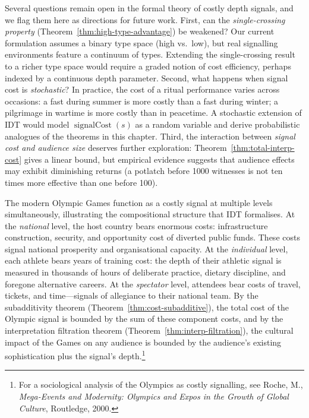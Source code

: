 \begin{remark}
Several questions remain open in the formal theory of costly depth
signals, and we flag them here as directions for future work.
First, can the \emph{single-crossing property}
(Theorem~\ref{thm:high-type-advantage}) be weakened?  Our current
formulation assumes a binary type space (high vs.\ low), but real
signalling environments feature a continuum of types.  Extending the
single-crossing result to a richer type space would require a graded
notion of cost efficiency, perhaps indexed by a continuous depth
parameter.  Second, what happens when signal cost is
\emph{stochastic}?  In practice, the cost of a ritual performance
varies across occasions: a fast during summer is more costly than a
fast during winter; a pilgrimage in wartime is more costly than in
peacetime.  A stochastic extension of IDT would model
$\operatorname{signalCost}(s)$ as a random variable and derive
probabilistic analogues of the theorems in this chapter.  Third, the
interaction between \emph{signal cost and audience size} deserves
further exploration: Theorem~\ref{thm:total-interp-cost} gives a
linear bound, but empirical evidence suggests that audience effects may
exhibit diminishing returns (a potlatch before 1000 witnesses is not
ten times more effective than one before 100).
\end{remark}

\begin{example}
The modern Olympic Games function as a costly signal at multiple
levels simultaneously, illustrating the compositional structure that
IDT formalises.  At the \emph{national} level, the host country bears
enormous costs: infrastructure construction, security, and
opportunity cost of diverted public funds.  These costs signal
national prosperity and organisational capacity.  At the
\emph{individual} level, each athlete bears years of training cost:
the depth of their athletic signal is measured in thousands of hours
of deliberate practice, dietary discipline, and foregone alternative
careers.  At the \emph{spectator} level, attendees bear costs of
travel, tickets, and time---signals of allegiance to their national
team.  By the subadditivity theorem
(Theorem~\ref{thm:cost-subadditive}), the total cost of the Olympic
signal is bounded by the sum of these component costs, and by the
interpretation filtration theorem
(Theorem~\ref{thm:interp-filtration}), the cultural impact of the
Games on any audience is bounded by the audience's existing
sophistication plus the signal's depth.\footnote{For a sociological
  analysis of the Olympics as costly signalling, see Roche, M.,
  \textit{Mega-Events and Modernity: Olympics and Expos in the Growth
  of Global Culture}, Routledge, 2000.}
\end{example}


